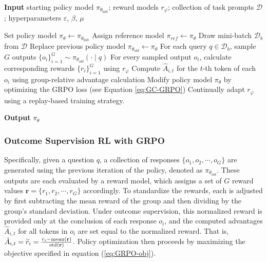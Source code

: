 \begin{itemize}[topsep=0pt]
\begin{itemize}[topsep=0pt]
\begin{algorithm}[t]
  \small
  \caption{Iterative Group Relative Policy Optimization}
  \textbf{Input} starting policy model $\pi_{\theta_{\text{init}}}$; reward models $r_\varphi$; collection of task prompts $\mathcal{D}$; 
  hyperparameters $\varepsilon$, $\beta$, $\mu$
  \begin{algorithmic}[1]
    \State Set policy model $\pi_\theta \leftarrow \pi_{\theta_{\text{init}}}$
      \State Assign reference model $\pi_{ref} \leftarrow \pi_{\theta}$
      \State Draw mini-batch $\mathcal{D}_b$ from $\mathcal{D}$
      \State Replace previous policy model $\pi_{\theta_{old}} \leftarrow \pi_{\theta}$
      \State For each query $q \in \mathcal{D}_b$, sample $G$ outputs $\{o_i\}_{i=1}^G \sim \pi_{\theta_{old}} (\cdot \mid q)$
      \State For every sampled output $o_i$, calculate corresponding rewards $\{r_i\}_{i=1}^G$ using $r_{\varphi}$
      \State Compute $\hat{A}_{i,t}$ for the $t$-th token of each $o_i$ using group-relative advantage calculation
        \State Modify policy model $\pi_{\theta}$ by optimizing the GRPO loss (see Equation \ref{eq:GC-GRPO})
      \EndFor
    \EndFor
    \State Continually adapt $r_\varphi$ using a replay-based training strategy. 
    \EndFor 
  \end{algorithmic}
  \textbf{Output} $\pi_\theta$
  \label{alg:iter-grpo}
\end{algorithm}

\subsubsection{Outcome Supervision RL with GRPO}  
Specifically, given a question $q$, a collection of responses $\{o_1, o_2, \cdots, o_G\}$ are generated using the previous iteration of the policy, denoted as $\pi_{\theta_{old}}$. These outputs are each evaluated by a reward model, which assigns a set of $G$ reward values $\mathbf{r} = \{r_1, r_2, \cdots, r_G\}$ accordingly. To standardize the rewards, each is adjusted by first subtracting the mean reward of the group and then dividing by the group's standard deviation. Under outcome supervision, this normalized reward is provided only at the conclusion of each response $o_i$, and the computed advantages $\hat{A}_{i, t}$ for all tokens in $o_i$ are set equal to the normalized reward. That is, $\hat{A}_{i, t} = \widetilde{r}_i = \frac{r_i- {\rm mean}(\mathbf{r})}{{\rm std}(\mathbf{r})}$. Policy optimization then proceeds by maximizing the objective specified in equation (\ref{eq:GRPO-obj}).


\end{itemize}
\end{itemize}
